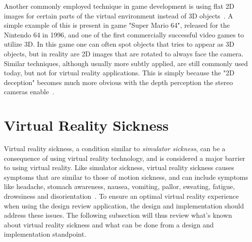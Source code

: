 Another commonly employed technique in game development is using flat 2D images for certain parts of the virtual environment instead of 3D objects~\citep{Ohannessian2016}.
A simple example of this is present in game "Super Mario 64", released for the Nintendo 64 in 1996, and one of the first commercially successful video games to utilize 3D.
In this game one can often spot objects that tries to appear as 3D objects, but in reality are 2D images that are rotated to always face the camera. 
Similar techniques, although usually more subtly applied, are still commonly used today, but not for virtual reality applications.
This is simply because the "2D deception" becomes much more obvious with the depth perception the stereo cameras enable~\citep{Ohannessian2016}. 



\section{Virtual Reality Sickness}
\label{sec:vr_sickness}

Virtual reality sickness, a condition similar to \textit{simulator sickness}, 
can be a consequence of using virtual reality technology, and is considered a major barrier to 
using virtual reality. Like simulator sickness, virtual reality sickness causes symptoms that are similar to those of motion sickness, and can include symptoms like 
headache, stomach awareness, nausea, vomiting, pallor, sweating, fatigue, drowsiness and disorientation~\citep{Kolasinski1995}. 
To ensure an optimal virtual reality experience when using the design review application, the design and implementation should address these issues.
The following subsection will thus review what's known about virtual reality sickness and what can be done from a design and 
implementation standpoint.

